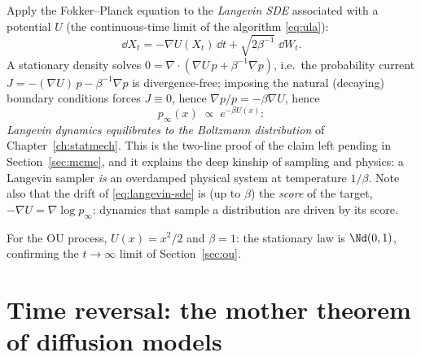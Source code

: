 Apply the Fokker--Planck equation to the \emph{Langevin SDE} associated with
a potential $U$ (the continuous-time limit of the algorithm
\eqref{eq:ula}):
\begin{equation}
  \dd X_t = -\nabla U(X_t)\,\dd t + \sqrt{2\beta^{-1}}\;\dd W_t .
  \label{eq:langevin-sde}
\end{equation}
A stationary density solves
$0 = \nabla \cdot ( \nabla U\, p + \beta^{-1} \nabla p )$, i.e.\ the
probability current $J = -(\nabla U)\,p - \beta^{-1}\nabla p$ is
divergence-free; imposing the natural (decaying) boundary conditions forces
$J \equiv 0$, hence $\nabla p / p = -\beta \nabla U$, hence
\begin{equation}
  p_\infty(x) \;\propto\; e^{-\beta U(x)} :
  \label{eq:langevin-boltzmann}
\end{equation}
\emph{Langevin dynamics equilibrates to the Boltzmann distribution} of
Chapter~\ref{ch:statmech}. This is the two-line proof of the claim left
pending in Section~\ref{sec:mcmc}, and it explains the deep kinship of
sampling and physics: a Langevin sampler \emph{is} an overdamped physical
system at temperature $1/\beta$. Note also that the drift of
\eqref{eq:langevin-sde} is (up to $\beta$) the \emph{score} of the target,
$-\nabla U = \nabla \log p_\infty$: dynamics that sample a distribution are
driven by its score.

For the OU process, $U(x) = x^2/2$ and $\beta = 1$: the stationary law is
$\Nd(0,1)$, confirming the $t \to \infty$ limit of Section~\ref{sec:ou}.

\section{Time reversal: the mother theorem of diffusion models}
\label{sec:reversal}

